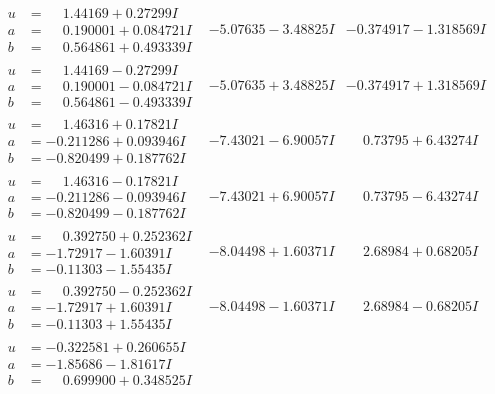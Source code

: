 \documentclass[1p]{elsarticle_modified}
\theoremstyle{definition}
\begin{document}
$$\begin{array}{c|c|c}
\begin{aligned}
u &= \phantom{-}1.44169 + 0.27299 I \\
a &= \phantom{-}0.190001 + 0.084721 I \\
b &= \phantom{-}0.564861 + 0.493339 I\end{aligned}
 & -5.07635 - 3.48825 I & -0.374917 - 1.318569 I \\ \hline\begin{aligned}
u &= \phantom{-}1.44169 - 0.27299 I \\
a &= \phantom{-}0.190001 - 0.084721 I \\
b &= \phantom{-}0.564861 - 0.493339 I\end{aligned}
 & -5.07635 + 3.48825 I & -0.374917 + 1.318569 I \\ \hline\begin{aligned}
u &= \phantom{-}1.46316 + 0.17821 I \\
a &= -0.211286 + 0.093946 I \\
b &= -0.820499 + 0.187762 I\end{aligned}
 & -7.43021 - 6.90057 I & \phantom{-}0.73795 + 6.43274 I \\ \hline\begin{aligned}
u &= \phantom{-}1.46316 - 0.17821 I \\
a &= -0.211286 - 0.093946 I \\
b &= -0.820499 - 0.187762 I\end{aligned}
 & -7.43021 + 6.90057 I & \phantom{-}0.73795 - 6.43274 I \\ \hline\begin{aligned}
u &= \phantom{-}0.392750 + 0.252362 I \\
a &= -1.72917 - 1.60391 I \\
b &= -0.11303 - 1.55435 I\end{aligned}
 & -8.04498 + 1.60371 I & \phantom{-}2.68984 + 0.68205 I \\ \hline\begin{aligned}
u &= \phantom{-}0.392750 - 0.252362 I \\
a &= -1.72917 + 1.60391 I \\
b &= -0.11303 + 1.55435 I\end{aligned}
 & -8.04498 - 1.60371 I & \phantom{-}2.68984 - 0.68205 I \\ \hline\begin{aligned}
u &= -0.322581 + 0.260655 I \\
a &= -1.85686 - 1.81617 I \\
b &= \phantom{-}0.699900 + 0.348525 I\end{aligned}

\end{array}$$
\end{document}
